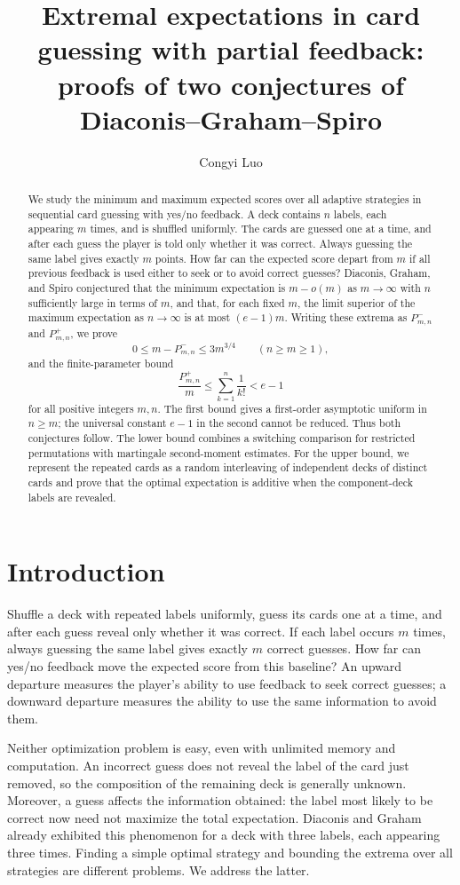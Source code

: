 \documentclass[11pt,reqno]{amsart}
\title[Extremal expectations in card guessing]{Extremal expectations in card guessing with partial feedback: proofs of two conjectures of Diaconis--Graham--Spiro}
\author{Congyi Luo}
\date{}
\numberwithin{equation}{section}
\theoremstyle{remark}
\theoremstyle{definition}
\begin{document}
\begin{abstract}
We study the minimum and maximum expected scores over all adaptive strategies in sequential card guessing with yes/no feedback. A deck contains $n$ labels, each appearing $m$ times, and is shuffled uniformly. The cards are guessed one at a time, and after each guess the player is told only whether it was correct. Always guessing the same label gives exactly $m$ points. How far can the expected score depart from $m$ if all previous feedback is used either to seek or to avoid correct guesses? Diaconis, Graham, and Spiro conjectured that the minimum expectation is $m-o(m)$ as $m\to\infty$ with $n$ sufficiently large in terms of $m$, and that, for each fixed $m$, the limit superior of the maximum expectation as $n\to\infty$ is at most $(e-1)m$. Writing these extrema as $P^-_{m,n}$ and $P^+_{m,n}$, we prove
\[
 0\le m-P^-_{m,n}\le3m^{3/4}
 \qquad(n\ge m\ge1),
\]
and the finite-parameter bound
\[
 \frac{P^+_{m,n}}m\le\sum_{k=1}^{n}\frac1{k!}<e-1
\]
for all positive integers $m,n$. The first bound gives a first-order asymptotic uniform in $n\ge m$; the universal constant $e-1$ in the second cannot be reduced. Thus both conjectures follow. The lower bound combines a switching comparison for restricted permutations with martingale second-moment estimates. For the upper bound, we represent the repeated cards as a random interleaving of independent decks of distinct cards and prove that the optimal expectation is additive when the component-deck labels are revealed.
\end{abstract}
\maketitle
\section{Introduction}
Shuffle a deck with repeated labels uniformly, guess its cards one at a time, and after each guess reveal only whether it was correct. If each label occurs $m$ times, always guessing the same label gives exactly $m$ correct guesses. How far can yes/no feedback move the expected score from this baseline? An upward departure measures the player's ability to use feedback to seek correct guesses; a downward departure measures the ability to use the same information to avoid them.

Neither optimization problem is easy, even with unlimited memory and computation. An incorrect guess does not reveal the label of the card just removed, so the composition of the remaining deck is generally unknown. Moreover, a guess affects the information obtained: the label most likely to be correct now need not maximize the total expectation. Diaconis and Graham~\cite[Section~3]{DG} already exhibited this phenomenon for a deck with three labels, each appearing three times. Finding a simple optimal strategy and bounding the extrema over all strategies are different problems. We address the latter.
\end{document}
